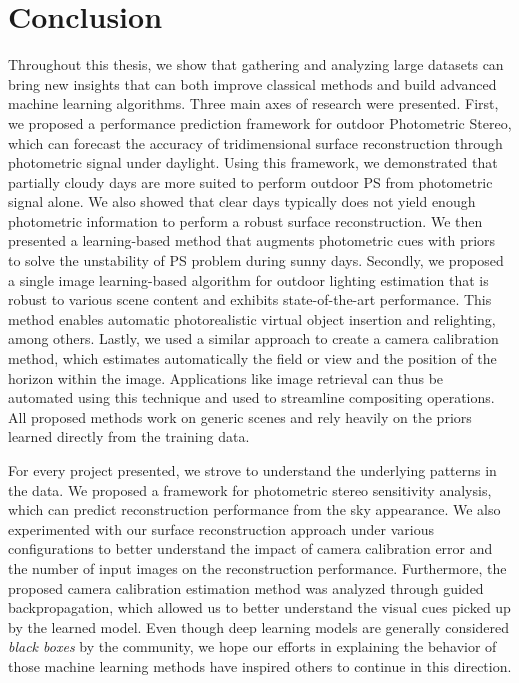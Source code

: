 \chapter*{Conclusion}         %


Throughout this thesis, we show that gathering and analyzing large datasets can bring new insights that can both improve classical methods and build advanced machine learning algorithms. Three main axes of research were presented. First, we proposed a performance prediction framework for outdoor Photometric Stereo, which can forecast the accuracy of tridimensional surface reconstruction through photometric signal under daylight. Using this framework, we demonstrated that partially cloudy days are more suited to perform outdoor PS from photometric signal alone. We also showed that clear days typically does not yield enough photometric information to perform a robust surface reconstruction. We then presented a learning-based method that augments photometric cues with priors to solve the unstability of PS problem during sunny days. Secondly, we proposed a single image learning-based algorithm for outdoor lighting estimation that is robust to various scene content and exhibits state-of-the-art performance. This method enables automatic photorealistic virtual object insertion and relighting, among others. Lastly, we used a similar approach to create a camera calibration method, which estimates automatically the field or view and the position of the horizon within the image. Applications like image retrieval can thus be automated using this technique and used to streamline compositing operations. All proposed methods work on generic scenes and rely heavily on the priors learned directly from the training data. 

For every project presented, we strove to understand the underlying patterns in the data. We proposed a framework for photometric stereo sensitivity analysis, which can predict reconstruction performance from the sky appearance. We also experimented with our surface reconstruction approach under various configurations to better understand the impact of camera calibration error and the number of input images on the reconstruction performance. Furthermore, the proposed camera calibration estimation method was analyzed through guided backpropagation, which allowed us to better understand the visual cues picked up by the learned model. Even though deep learning models are generally considered \emph{black boxes} by the community, we hope our efforts in explaining the behavior of those machine learning methods have inspired others to continue in this direction.

